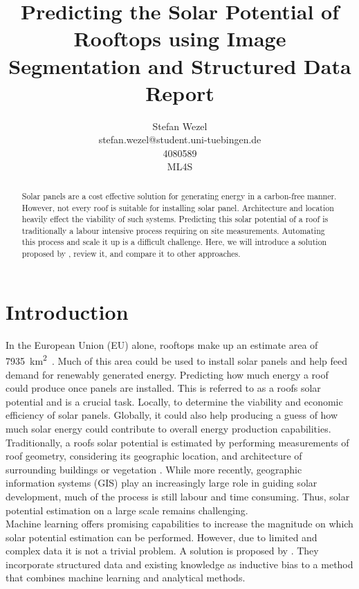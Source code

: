 \documentclass{article} %
\title{Predicting the Solar Potential of Rooftops using
	Image Segmentation and Structured Data\\ \vspace{0.5cm}\large{Report}}
\author{Stefan Wezel \\ stefan.wezel@student.uni-tuebingen.de \\4080589  \\ ML4S}
\def\figwidth{.5\linewidth}
\def\figheight{.15\textheight}
\begin{document}
\maketitle

\begin{abstract}
	Solar panels are a cost effective solution for generating energy in a carbon-free manner. However, not every roof is suitable for installing solar panel. Architecture and location heavily effect the viability of such systems.
	Predicting this solar potential of a roof is traditionally a labour intensive process requiring on site measurements. Automating this process and scale it up is a difficult challenge. Here, we will introduce a solution proposed by \citet{de2021predicting}, review it, and compare it to other approaches.
\end{abstract}

\section*{Introduction}
In the European Union (EU) alone, rooftops make up an estimate area of \SI{7935}{\kilo\metre\squared}~\cite{bodis2019high}. Much of this area could be used to install solar panels and help feed demand for renewably generated energy. Predicting how much energy a roof could produce once panels are installed. This is referred to as a roofs solar potential and is a crucial task. Locally, to determine the viability and economic efficiency of solar panels. Globally, it could also help producing a guess of how much solar energy could contribute to overall energy production capabilities.\\
Traditionally, a roofs solar potential is estimated by performing measurements of roof geometry, considering its geographic location, and architecture of surrounding buildings or vegetation \cite{freitas2015modelling}. While more recently, geographic information systems (GIS) play an increasingly large role in guiding solar development, much of the process is still labour and time consuming. Thus, solar potential estimation on a large scale remains challenging.\\
Machine learning offers promising capabilities to increase the magnitude on which solar potential estimation can be performed. However, due to limited and complex data it is not a trivial problem. A solution is proposed by \citet{de2021predicting}. They incorporate structured data and existing knowledge as inductive bias to a method that combines machine learning and analytical methods.
\end{document}
